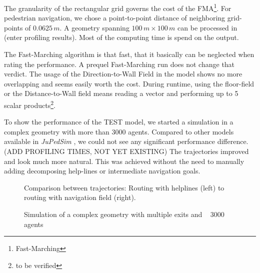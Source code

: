 The granularity of the rectangular grid governs the cost of the FMA\footnote{Fast-Marching}. For pedestrian navigation, we chose a point-to-point distance of neighboring grid-points of $0.0625\,m$. A geometry spanning $100\,m \times 100\,m$ can be processed in (enter profiling results). Most of the computing time is spend on the output.

The Fast-Marching algorithm is that fast, that it basically can be neglected when rating the performance. A prequel Fast-Marching run does not change that verdict. The usage of the Direction-to-Wall Field in the model shows no more overlapping and seems easily worth the cost. During runtime, using the floor-field or the Distance-to-Wall field means reading a vector and performing up to 5 scalar products\footnote{to be verified}.

To show the performance of the TEST model, we started a simulation in a complex geometry with more than 3000 agents. Compared to other models available in \emph{JuPedSim} \citep{jupedsim}, we could not see any significant performance difference. (ADD PROFILING TIMES, NOT YET EXISTING)
The trajectories improved and look much more natural. This was achieved without the need to manually adding decomposing help-lines or intermediate navigation goals.

\begin{figure}[h!]
\caption{Comparison between trajectories: Routing with helplines (left) to routing with navigation field (right).}
\end{figure}

\begin{figure}[h!]
\caption{Simulation of a complex geometry with multiple exits and ~ 3000 agents}
\label{fig:verteilerebene}
\end{figure}
